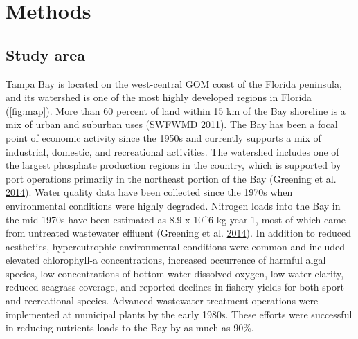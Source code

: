 \documentclass[]{article}
\begin{document}
\hypertarget{methods}{%
\section{Methods}\label{methods}}

\hypertarget{study-area}{%
\subsection{Study area}\label{study-area}}

Tampa Bay is located on the west-central GOM coast of the Florida
peninsula, and its watershed is one of the most highly developed regions
in Florida (\cref{fig:map}). More than 60 percent of land within 15 km
of the Bay shoreline is a mix of urban and suburban uses (SWFWMD 2011).
The Bay has been a focal point of economic activity since the 1950s and
currently supports a mix of industrial, domestic, and recreational
activities. The watershed includes one of the largest phosphate
production regions in the country, which is supported by port operations
primarily in the northeast portion of the Bay (Greening et al.
\protect\hyperlink{ref-Greening2014}{2014}). Water quality data have
been collected since the 1970s when environmental conditions were highly
degraded. Nitrogen loads into the Bay in the mid-1970s have been
estimated as 8.9 x 10\^{}6 kg year-1, most of which came from untreated
wastewater effluent (Greening et al.
\protect\hyperlink{ref-Greening2014}{2014}). In addition to reduced
aesthetics, hypereutrophic environmental conditions were common and
included elevated chlorophyll-a concentrations, increased occurrence of
harmful algal species, low concentrations of bottom water dissolved
oxygen, low water clarity, reduced seagrass coverage, and reported
declines in fishery yields for both sport and recreational species.
Advanced wastewater treatment operations were implemented at municipal
plants by the early 1980s. These efforts were successful in reducing
nutrients loads to the Bay by as much as 90\%.
\end{document}
